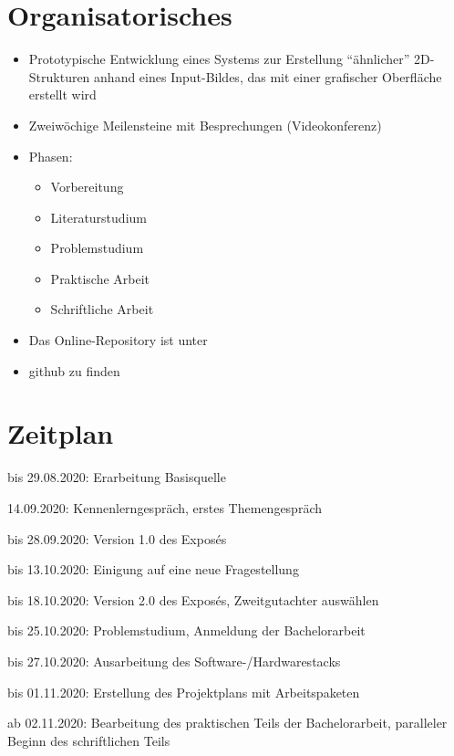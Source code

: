 \documentclass[11pt]{article}
\newcommand{\cmark}{\ding{51}}%
\newcommand{\done}{\rlap{$\square$}{\raisebox{2pt}{\large\hspace{1pt}\cmark}}%
\hspace{-2.5pt}}
\begin{document}
    \newpage

    \begin{itemize}

    \end{itemize}

    \section{Organisatorisches}
    \begin{itemize}
        \item Prototypische Entwicklung eines Systems zur Erstellung "`ähnlicher"' 2D-Strukturen anhand eines
        Input-Bildes, das mit einer grafischer Oberfläche erstellt wird
        \item Zweiwöchige Meilensteine mit Besprechungen (Videokonferenz)
        \item Phasen:
        \begin{itemize}
            \item Vorbereitung
            \item Literaturstudium
            \item Problemstudium
            \item Praktische Arbeit
            \item Schriftliche Arbeit
        \end{itemize}
        \item Das Online-Repository ist unter~\item{github} zu finden
    \end{itemize}

    \section{Zeitplan}
    \begin{todolist}
        \item[\done] bis 29.08.2020: Erarbeitung Basisquelle
        \item[\done] 14.09.2020: Kennenlerngespräch, erstes Themengespräch
        \item[\done] bis 28.09.2020: Version 1.0 des Exposés
        \item[\done] bis 13.10.2020: Einigung auf eine neue Fragestellung
        \item[\done] bis 18.10.2020: Version 2.0 des Exposés, Zweitgutachter auswählen
        \item bis 25.10.2020: Problemstudium, Anmeldung der Bachelorarbeit
        \item bis 27.10.2020: Ausarbeitung des Software-/Hardwarestacks
        \item bis 01.11.2020: Erstellung des Projektplans mit Arbeitspaketen
        \item ab 02.11.2020: Bearbeitung des praktischen Teils der Bachelorarbeit, paralleler Beginn des schriftlichen
        Teils
    \end{todolist}

    \newpage

    \listoffigures

    
    
\end{document}

